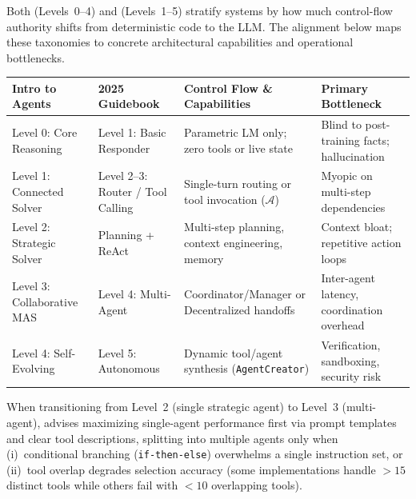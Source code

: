 \documentclass[../../../../master.tex]{subfiles}
\begin{document}
\begin{crossbook}
\label{tab:agent:taxonomy_levels}
Both  (Levels~0--4) and  (Levels~1--5) stratify systems by how much control-flow authority shifts from deterministic code to the LLM. The alignment below maps these taxonomies to concrete architectural capabilities and operational bottlenecks.
\par\medskip
\renewcommand{\arraystretch}{1.22}
\begin{tabularx}{\linewidth}{@{} >{\raggedright\arraybackslash}p{2.75cm} >{\raggedright\arraybackslash}p{2.75cm} >{\raggedright\arraybackslash}X >{\raggedright\arraybackslash}X @{}}
  \toprule
  \textbf{Intro to Agents} & \textbf{2025 Guidebook} & \textbf{Control Flow \& Capabilities} & \textbf{Primary Bottleneck} \\
  \midrule
  Level 0: Core Reasoning & Level 1: Basic Responder & Parametric LM only; zero tools or live state & Blind to post-training facts; hallucination \\
  Level 1: Connected Solver & Level 2--3: Router / Tool Calling & Single-turn routing or tool invocation ($\mathcal{A}$) & Myopic on multi-step dependencies \\
  Level 2: Strategic Solver & Planning + ReAct & Multi-step planning, context engineering, memory & Context bloat; repetitive action loops \\
  Level 3: Collaborative MAS & Level 4: Multi-Agent & Coordinator/Manager or Decentralized handoffs & Inter-agent latency, coordination overhead \\
  Level 4: Self-Evolving & Level 5: Autonomous & Dynamic tool/agent synthesis (\texttt{AgentCreator}) & Verification, sandboxing, security risk \\
  \bottomrule
\end{tabularx}
\end{crossbook}

{\sloppy
When transitioning from Level~2 (single strategic agent) to Level~3 (multi-agent),  advises maximizing single-agent performance first via prompt templates and clear tool descriptions, splitting into multiple agents only when (i)~conditional branching (\texttt{if-then-else}) overwhelms a single instruction set, or (ii)~tool overlap degrades selection accuracy (some implementations handle $>15$ distinct tools while others fail with $<10$ overlapping tools).\par}
\end{document}

